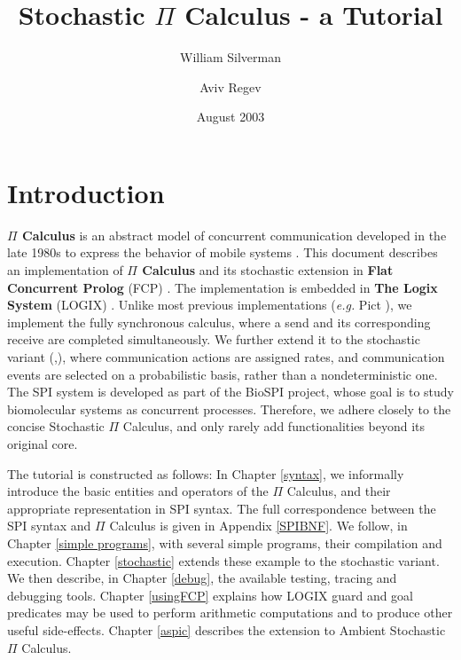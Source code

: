 \title{Stochastic $\Pi$ Calculus - a Tutorial}
\author{William Silverman \and Aviv Regev}
\date{August 2003}
 
\maketitle

\tableofcontents

\chapter{Introduction}
{\bf $\Pi$ Calculus} is an abstract model of concurrent communication
developed in the late 1980s to express the behavior of mobile systems
\cite{Milner99}.  This document describes an implementation of
{\bf $\Pi$ Calculus} and its stochastic extension in {\bf Flat
Concurrent Prolog} (FCP) \cite{Shapiro87a}.  The implementation is
embedded in {\bf The Logix System} (LOGIX)
\cite{logix:user-man,logix:user-man-supp}. Unlike most previous
implementations ({\em e.g.} Pict \cite{PT99}), we implement the fully
synchronous calculus, where a send and its corresponding receive
are completed simultaneously.  We further extend it to the stochastic
variant (\cite{Pri95},\cite{RPSS}), where communication actions are
assigned rates, and communication events are selected on a
probabilistic basis, rather than a nondeterministic one.  The SPI
system is developed as part of the BioSPI project, whose goal is to
study biomolecular systems as concurrent processes. Therefore, we
adhere closely to the concise Stochastic $\Pi$ Calculus, and only rarely
add functionalities beyond its original core.

The tutorial is constructed as follows: In Chapter \ref{syntax}, we
informally introduce the basic entities and operators of the
$\Pi$ Calculus, and their appropriate representation in SPI syntax. The
full correspondence between the SPI syntax and $\Pi$ Calculus is given in
Appendix \ref{SPIBNF}.  We follow, in Chapter \ref{simple programs}, with
several simple programs, their compilation and execution. Chapter
\ref{stochastic} extends these example to the stochastic variant.  We
then describe, in Chapter \ref{debug}, the available testing,
tracing and debugging tools. Chapter \ref{usingFCP} explains how
LOGIX guard and goal predicates may be used to perform arithmetic
computations and to produce other useful side-effects.  Chapter
\ref{aspic} describes the extension to Ambient Stochastic
$\Pi$ Calculus.

